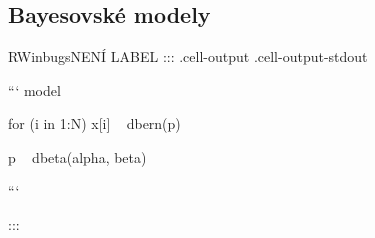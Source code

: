 \documentclass[
  11pt,
  a4paper]{report}
\begin{document}
\printbibliography[title={\bibnamex},heading={bibintoc}]

\part*{\Prilohy\thispagestyle{empty}}
\appendix

\chapter{Bayesovské modely}\label{bayesovskuxe9-modely}

\begin{model}{R}{Winbugs}{NENÍ LABEL}
::: {.cell-output .cell-output-stdout}


```
model {
    for (i in 1:N) {
        x[i] ~ dbern(p)
    }

    p ~ dbeta(alpha, beta)
}
```


:::


\end{model}
\end{document}
